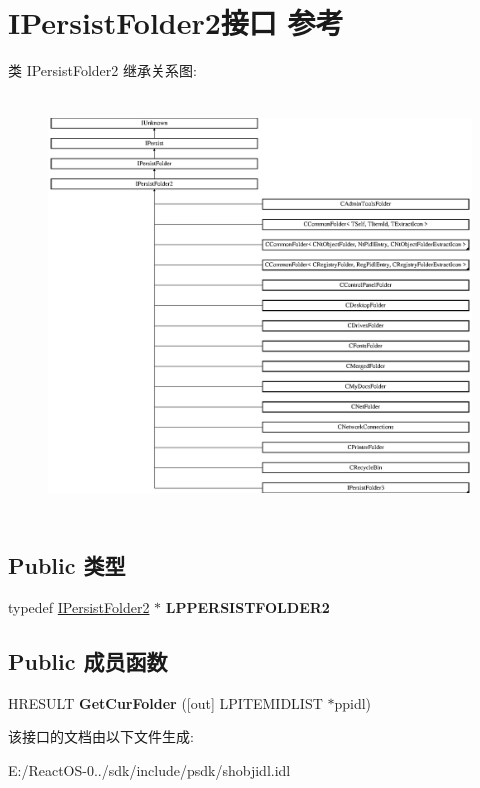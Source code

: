 \hypertarget{interface_i_persist_folder2}{}\section{I\+Persist\+Folder2接口 参考}
\label{interface_i_persist_folder2}
类 I\+Persist\+Folder2 继承关系图\+:\begin{figure}[H]
\begin{center}
\leavevmode
\includegraphics[height=11.176470cm]{interface_i_persist_folder2}
\end{center}
\end{figure}
\subsection*{Public 类型}
\begin{DoxyCompactItemize}
\item 
\mbox{\label{interface_i_persist_folder2_accf072bf657ed979f5b1279fcea7cd2f}} 
typedef \hyperlink{interface_i_persist_folder2}{I\+Persist\+Folder2} $\ast$ {\bfseries L\+P\+P\+E\+R\+S\+I\+S\+T\+F\+O\+L\+D\+E\+R2}
\end{DoxyCompactItemize}
\subsection*{Public 成员函数}
\begin{DoxyCompactItemize}
\item 
\mbox{\label{interface_i_persist_folder2_a618e37c67a30f3e1720b2d1bf9760a13}} 
H\+R\+E\+S\+U\+LT {\bfseries Get\+Cur\+Folder} (\mbox{[}out\mbox{]} L\+P\+I\+T\+E\+M\+I\+D\+L\+I\+ST $\ast$ppidl)
\end{DoxyCompactItemize}


该接口的文档由以下文件生成\+:\begin{DoxyCompactItemize}
\item 
E\+:/\+React\+O\+S-\/0../sdk/include/psdk/shobjidl.\+idl\end{DoxyCompactItemize}
